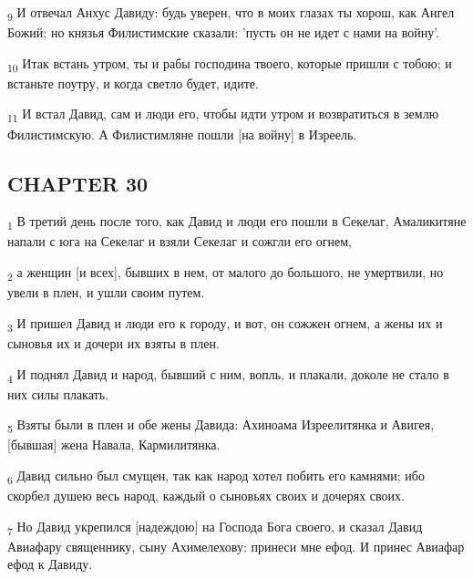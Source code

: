 \begin{tcolorbox}
\textsubscript{9} И отвечал Анхус Давиду: будь уверен, что в моих глазах ты хорош, как Ангел Божий; но князья Филистимские сказали: 'пусть он не идет с нами на войну'.
\end{tcolorbox}
\begin{tcolorbox}
\textsubscript{10} Итак встань утром, ты и рабы господина твоего, которые пришли с тобою; и встаньте поутру, и когда светло будет, идите.
\end{tcolorbox}
\begin{tcolorbox}
\textsubscript{11} И встал Давид, сам и люди его, чтобы идти утром и возвратиться в землю Филистимскую. А Филистимляне пошли [на войну] в Изреель.
\end{tcolorbox}
\subsection{CHAPTER 30}
\begin{tcolorbox}
\textsubscript{1} В третий день после того, как Давид и люди его пошли в Секелаг, Амаликитяне напали с юга на Секелаг и взяли Секелаг и сожгли его огнем,
\end{tcolorbox}
\begin{tcolorbox}
\textsubscript{2} а женщин [и всех], бывших в нем, от малого до большого, не умертвили, но увели в плен, и ушли своим путем.
\end{tcolorbox}
\begin{tcolorbox}
\textsubscript{3} И пришел Давид и люди его к городу, и вот, он сожжен огнем, а жены их и сыновья их и дочери их взяты в плен.
\end{tcolorbox}
\begin{tcolorbox}
\textsubscript{4} И поднял Давид и народ, бывший с ним, вопль, и плакали, доколе не стало в них силы плакать.
\end{tcolorbox}
\begin{tcolorbox}
\textsubscript{5} Взяты были в плен и обе жены Давида: Ахиноама Изреелитянка и Авигея, [бывшая] жена Навала, Кармилитянка.
\end{tcolorbox}
\begin{tcolorbox}
\textsubscript{6} Давид сильно был смущен, так как народ хотел побить его камнями; ибо скорбел душею весь народ, каждый о сыновьях своих и дочерях своих.
\end{tcolorbox}
\begin{tcolorbox}
\textsubscript{7} Но Давид укрепился [надеждою] на Господа Бога своего, и сказал Давид Авиафару священнику, сыну Ахимелехову: принеси мне ефод. И принес Авиафар ефод к Давиду.
\end{tcolorbox}
